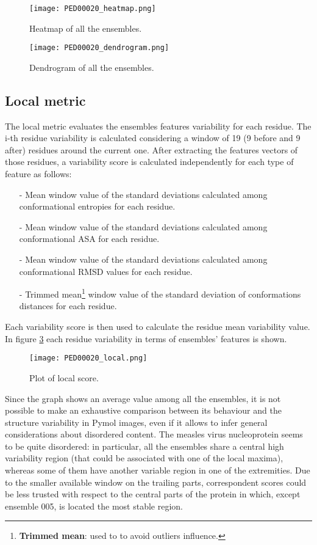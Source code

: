 \begin{figure}[H]
    \centering
	\texttt{[image: PED00020\_heatmap.png]}
	\caption{Heatmap of all the ensembles.}
	\label{heatmap}
\end{figure}
\begin{figure}[H]
    \centering
	\texttt{[image: PED00020\_dendrogram.png]}
	\caption{Dendrogram of all the ensembles.}
	\label{dendrogram}
\end{figure}


\subsection{Local metric}
The local metric evaluates the ensembles features variability for each residue.
The i-th residue variability is calculated considering a window of 19 (9 before and 9 after) residues around the current one. After extracting the features vectors of those residues, a variability score is calculated independently for each type of feature as follows:

\begin{itemize}
\item[-] Mean window value of the standard deviations calculated among conformational entropies for each residue.
\item[-] Mean window value of the standard deviations calculated among conformational ASA for each residue.
\item[-] Mean window value of the standard deviations calculated among conformational RMSD values for each residue.
\item[-] Trimmed mean\footnote{\textbf{Trimmed mean}: used to to avoid outliers influence.} window value of the standard deviation of conformations distances for each residue.
\end{itemize}

Each variability score is then used to calculate the residue mean variability value. In figure \ref{plot} each residue variability in terms of ensembles' features is shown.

\begin{figure}[H]
    \centering
	\texttt{[image: PED00020\_local.png]}
	\caption{Plot of local score.}
	\label{plot}
\end{figure}

Since the graph shows an average value among all the ensembles, it is not possible to make an exhaustive comparison between its behaviour and the structure variability in Pymol images, even if it allows to infer general considerations about disordered content. The measles virus nucleoprotein seems to be quite disordered: in particular, all the ensembles share a central high variability region (that could be associated with one of the local maxima), whereas some of them have another variable region in one of the extremities. Due to the smaller available window on the trailing parts, correspondent scores could be less trusted with respect to the central parts of the protein in which, except ensemble 005, is located the most stable region.

